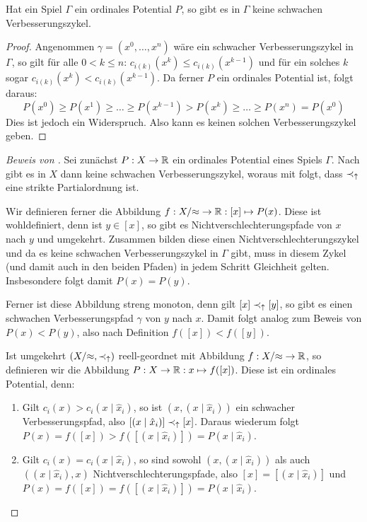 \begin{prop}\label{prop:OrdPotKeineschwVBZ}
	Hat ein Spiel $\Gamma$ ein ordinales Potential $P$, so gibt es in $\Gamma$ keine schwachen Verbesserungszykel.
\end{prop}

\begin{proof}
	Angenommen $\gamma = (x^0, \dots, x^n)$ wäre ein schwacher Verbesserungszykel in $\Gamma$, so gilt für alle $0 < k \leq n$: $c_{i(k)}(x^k) \leq c_{i(k)}(x^{k-1})$ und für ein solches $k$ sogar $c_{i(k)}(x^k) < c_{i(k)}(x^{k-1})$. Da ferner $P$ ein ordinales Potential ist, folgt daraus:
		\[P(x^0) \geq P(x^1) \geq \dots \geq P(x^{k-1}) > P(x^k) \geq \dots \geq P(x^n) = P(x^0)\]
	Dies ist jedoch ein Widerspruch. Also kann es keinen solchen Verbesserungszykel geben.
\end{proof}

\begin{proof}[Beweis von ]
	Sei zunächst $P: X \to \mathbb{R}$ ein ordinales Potential eines Spiels $\Gamma$. Nach  gibt es in $X$ dann keine schwachen Verbesserungszykel, woraus mit  folgt, dass $\prec_\uparrow$ eine strikte Partialordnung ist. 
	
	Wir definieren ferner die Abbildung $f: X/{\approx} \to \mathbb{R}: [x] \mapsto P(x)$. Diese ist wohldefiniert, denn ist $y \in [x]$, so gibt es Nichtverschlechterungspfade von $x$ nach $y$ und umgekehrt. Zusammen bilden diese einen Nichtverschlechterungszykel und da es keine schwachen Verbesserungszykel in $\Gamma$ gibt, muss in diesem Zykel (und damit auch in den beiden Pfaden) in jedem Schritt Gleichheit gelten. Insbesondere folgt damit $P(x) = P(y)$.
		
	Ferner ist diese Abbildung streng monoton, denn gilt $[x] \prec_\uparrow [y]$, so gibt es einen schwachen Verbesserungspfad $\gamma$ von $y$ nach $x$. Damit folgt analog zum Beweis von  $P(x) < P(y)$, also nach Definition $f([x]) < f([y])$.
	
	Ist umgekehrt $(X/{\approx}, \prec_\uparrow)$ reell-geordnet mit Abbildung $f: X/{\approx} \to \mathbb{R}$, so definieren wir die Abbildung $P: X \to \mathbb{R}: x \mapsto f([x])$. Diese ist ein ordinales Potential, denn:
	\begin{enumerate}
		\item Gilt $c_i(x) > c_i(x \mid \hat{x}_i)$, so ist $(x, (x \mid \hat{x}_i))$ ein schwacher Verbesserungspfad, also $[(x \mid \hat{x}_i)] \prec_\uparrow [x]$. Daraus wiederum folgt $P(x) = f([x]) > f([(x \mid \hat{x}_i)]) = P(x \mid \hat{x}_i)$.
		\item Gilt $c_i(x) = c_i(x \mid \hat{x}_i)$, so sind sowohl $(x, (x \mid \hat{x}_i))$ als auch $((x \mid \hat{x}_i), x)$ Nichtverschlechterungspfade, also $[x] = [(x \mid \hat{x}_i)]$ und $P(x) = f([x]) = f([(x \mid \hat{x}_i)]) = P(x \mid \hat{x}_i)$. \qedhere 
	\end{enumerate}
\end{proof}

